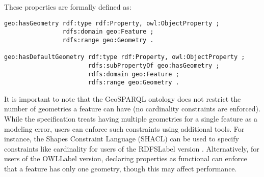 These properties are formally defined as:

\begin{lstlisting}[caption=Definition of the properties \texttt{geo:hasGeometry} and \texttt{geo:hasDefaultGeometry} , label={lst:definition-hasGeometry}]
geo:hasGeometry rdf:type rdf:Property, owl:ObjectProperty ;
                rdfs:domain geo:Feature ;
                rdfs:range geo:Geometry .

geo:hasDefaultGeometry rdf:type rdf:Property, owl:ObjectProperty ;
                       rdfs:subPropertyOf geo:hasGeometry ;
                       rdfs:domain geo:Feature ;
                       rdfs:range geo:Geometry .
\end{lstlisting}

It is important to note that the GeoSPARQL ontology does not restrict the number of geometries a feature can have (no cardinality constraints are enforced). While the specification treats having multiple geometries for a single feature as a modeling error, users can enforce such constraints using additional tools. For instance, the Shapes Constraint Language (SHACL) can be used to specify constraints like cardinality for users of the \acrshort{RDFSLabel} version \cite{holgerknublauchShapesConstraintLanguage2017}. Alternatively, for users of the \acrshort{OWLLabel} version, declaring properties as functional can enforce that a feature has only one geometry, though this may affect performance.





